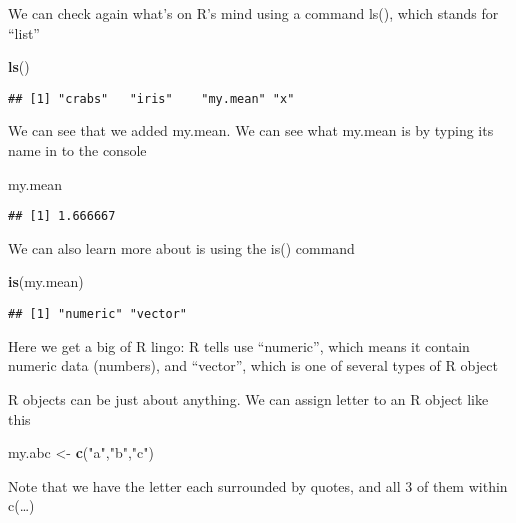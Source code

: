 \documentclass[]{book}
\newenvironment{Shaded}{\begin{snugshade}}{\end{snugshade}}
\newcommand{\KeywordTok}[1]{\textcolor[rgb]{0.13,0.29,0.53}{\textbf{#1}}}
\newcommand{\StringTok}[1]{\textcolor[rgb]{0.31,0.60,0.02}{#1}}
\newcommand{\NormalTok}[1]{#1}
\theoremstyle{definition}
\theoremstyle{definition}
\theoremstyle{definition}
\theoremstyle{remark}
\begin{document}
We can check again what's on R's mind using a command ls(), which stands
for ``list''

\begin{Shaded}
\begin{Highlighting}[]
\KeywordTok{ls}\NormalTok{()}
\end{Highlighting}
\end{Shaded}

\begin{verbatim}
## [1] "crabs"   "iris"    "my.mean" "x"
\end{verbatim}

We can see that we added my.mean. We can see what my.mean is by typing
its name in to the console

\begin{Shaded}
\begin{Highlighting}[]
\NormalTok{my.mean}
\end{Highlighting}
\end{Shaded}

\begin{verbatim}
## [1] 1.666667
\end{verbatim}

We can also learn more about is using the is() command

\begin{Shaded}
\begin{Highlighting}[]
\KeywordTok{is}\NormalTok{(my.mean)}
\end{Highlighting}
\end{Shaded}

\begin{verbatim}
## [1] "numeric" "vector"
\end{verbatim}

Here we get a big of R lingo: R tells use ``numeric'', which means it
contain numeric data (numbers), and ``vector'', which is one of several
types of R object

R objects can be just about anything. We can assign letter to an R
object like this

\begin{Shaded}
\begin{Highlighting}[]
\NormalTok{my.abc <-}\StringTok{ }\KeywordTok{c}\NormalTok{(}\StringTok{"a"}\NormalTok{,}\StringTok{"b"}\NormalTok{,}\StringTok{"c"}\NormalTok{)}
\end{Highlighting}
\end{Shaded}

Note that we have the letter each surrounded by quotes, and all 3 of
them within c(\ldots{})
\end{document}
